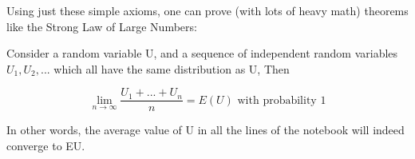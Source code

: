 Using just these simple axioms, one can prove (with lots of heavy math)
theorems like the Strong Law of Large Numbers:

\begin{theorem}
Consider a random variable U, and a sequence of independent random
variables $U_1, U_2, ...$ which all have the same distribution as U,
Then

\begin{equation}
\label{slln}
\lim_{n \rightarrow \infty} \frac{U_1+...+U_n}{n} = E(U) \textrm{ with
probability 1}
\end{equation}
\end{theorem}

In other words, the average value of U in all the lines of the notebook
will indeed converge to EU.

